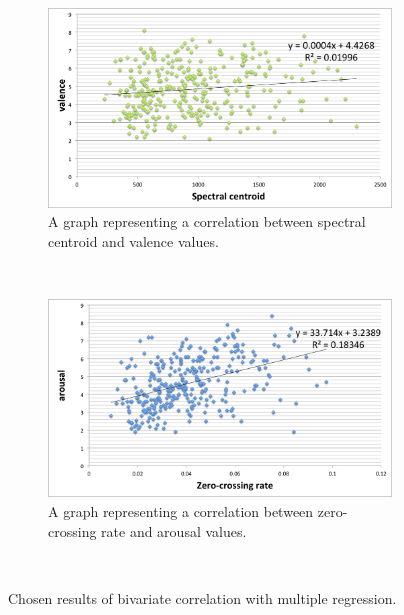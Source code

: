 \begin{figure}
        \centering
        \begin{subfigure}[b]{0.48\textwidth}
                \includegraphics[width=\textwidth]{Figures/spectralcentroid-valence}
                \caption{A graph representing a correlation between spectral centroid and valence values.}
        \end{subfigure}%
        ~ %
        \begin{subfigure}[b]{0.48\textwidth}
                \includegraphics[width=\textwidth]{Figures/zerocrossing-arousal}
                \caption{A graph representing a correlation between zero-crossing rate and arousal values.}
        \end{subfigure}
          \caption{Chosen results of bivariate correlation with multiple regression.}
        ~ %
                        \label{fig:bivariateNN}

\end{figure}

